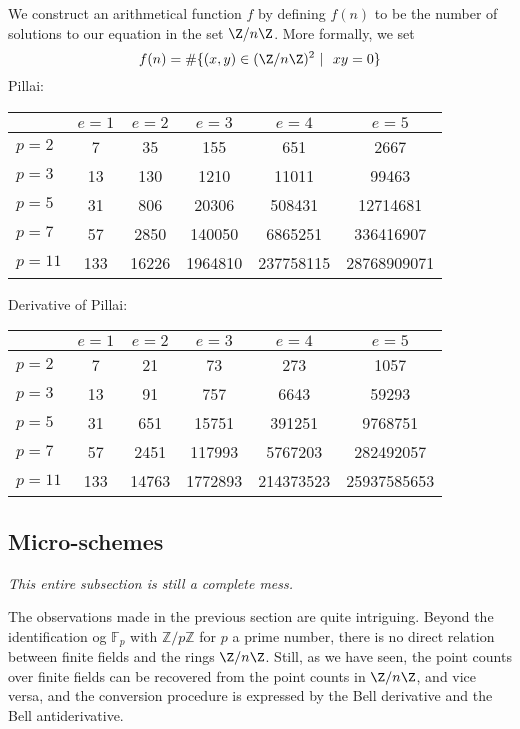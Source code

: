 \documentclass[a4paper]{article}
\begin{document}
We construct an arithmetical function $f$ by defining $f(n)$ to be the number of solutions to our equation in the set $\Z / n \Z$. More formally, we set
$$  f(n) = \# \{  (x, y) \in (\Z / n \Z)^2 \  \vert \ \   xy = 0   \}   $$
Pillai:
\begin{table}[h]
\centering
\begin{tabular}{| l | | c | c | c | c | c |}
\hline
& $e = 1$ & $e = 2$ & $e = 3$ & $e = 4$ & $e = 5$\\
\hline
\hline
$p = 2$ & 7 & 35 & 155 & 651 & 2667 \\
\hline
$p = 3$ & 13 & 130 & 1210 & 11011 & 99463 \\
\hline
$p = 5$ & 31 & 806 & 20306 & 508431 & 12714681 \\
\hline
$p = 7$ & 57 & 2850 & 140050 & 6865251 & 336416907 \\
\hline
$p = 11$ & 133 & 16226 & 1964810 & 237758115 & 28768909071 \\
\hline
\end{tabular}
\end{table}

Derivative of Pillai:
\begin{table}[h]
\centering
\begin{tabular}{| l | | c | c | c | c | c |}
\hline
& $e = 1$ & $e = 2$ & $e = 3$ & $e = 4$ & $e = 5$\\
\hline
\hline
$p = 2$ & 7 & 21 & 73 & 273 & 1057 \\
\hline
$p = 3$ & 13 & 91 & 757 & 6643 & 59293 \\
\hline
$p = 5$ & 31 & 651 & 15751 & 391251 & 9768751 \\
\hline
$p = 7$ & 57 & 2451 & 117993 & 5767203 & 282492057 \\
\hline
$p = 11$ & 133 & 14763 & 1772893 & 214373523 & 25937585653 \\
\hline
\end{tabular}
\end{table}




\subsection{Micro-schemes}


\emph{This entire subsection is still a complete mess.}

The observations made in the previous section are quite intriguing. Beyond the identification og $\mathbb{F}_p$ with $\mathbb{Z} / p \mathbb{Z}$ for $p$ a prime number, there is no direct relation between finite fields and the rings $\Z / n \Z$. Still, as we have seen, the point counts over finite fields can be recovered from the point counts in $\Z / n \Z$, and vice versa, and the conversion procedure is expressed by the Bell derivative and the Bell antiderivative.
\end{document}
